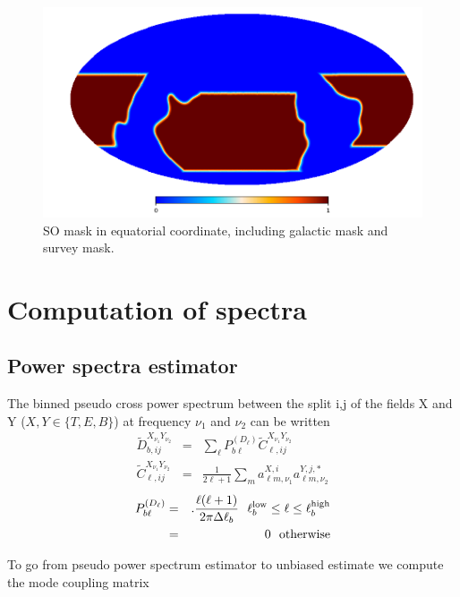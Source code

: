 \documentclass[a4paper, 11pt]{article}
\def\ba{\begin{eqnarray}}
\def\ea{\end{eqnarray}}
\begin{document}
\begin{figure}
  \centering
  \includegraphics[width=1 \textwidth]{window_LAT_145.png}
  \caption{SO mask in equatorial coordinate, including galactic mask and survey mask.}
  \label{fig:mask}
\end{figure}




\section{Computation of spectra}

\subsection{Power spectra estimator}

The binned pseudo cross power spectrum between the split i,j of the fields X and Y ($X, Y \in \{T,E,B \}$) at frequency $\nu_{1}$ and $\nu_{2}$ can be written
\ba
\tilde{D}^{X_{\nu_{1}}Y_{\nu_{2}}}_{b, ij} &=& \sum_{\ell} P^{(D_{\ell})}_{b \ell} \tilde{C}^{X_{\nu_{1}}Y_{\nu_{2}}}_{\ell, ij} \\
\tilde{C}^{X_{\nu_{1}}Y_{\nu_{2}}}_{\ell, ij}  &=&  \frac{1}{2\ell +1} \sum_{m}  a^{X, i}_{\ell m, \nu_{1}}  a^{Y, j, *}_{\ell m, \nu_{2}}
\ea
\ba
P^{(D_{\ell})}_{b \ell} &=&.  \frac{\ell (\ell+1) }{ 2\pi \Delta \ell_{b}} \ \ \ell^{\rm low}_{b} \le \ell \le \ell^{\rm high}_{b} \nonumber \\
&=& 0 \ \ {\rm otherwise}
\ea
 
To go from pseudo power spectrum estimator to unbiased estimate we compute the mode coupling matrix
\end{document}
